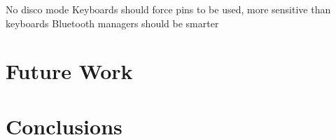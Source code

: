 \documentclass{acm_proc_article-sp}
\begin{document}
No disco mode
Keyboards should force pins to be used, more sensitive than keyboards
Bluetooth managers should be smarter

\section{Future Work}

\section{Conclusions}

%


\balancecolumns
\end{document}
